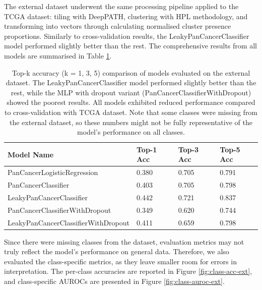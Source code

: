 \documentclass{l4proj}
\begin{document}
The external dataset underwent the same processing pipeline applied to the TCGA dataset: tiling with DeepPATH, clustering with HPL methodology, and transforming into vectors through calculating normalised cluster presence proportions. Similarly to cross-validation results, the LeakyPanCancerClassifier model performed slightly better than the rest. The comprehensive results from all models are summarised in Table \ref{tab:ext-results}.

\begin{table}[h]
\centering
\caption{Top-k accuracy (k = 1, 3, 5) comparison of models evaluated on the external dataset. The LeakyPanCancerClassifier model performed slightly better than the rest, while the MLP with dropout variant (PanCancerClassifierWithDropout) showed the poorest results. All models exhibited reduced performance compared to cross-validation with TCGA dataset. Note that some classes were missing from the external dataset, so these numbers might not be fully representative of the model's performance on all classes.}
\label{tab:ext-results}
\begin{tabular}{@{}llll@{}}
\textbf{Model Name}                 & \textbf{Top-1 Acc} & \textbf{Top-3 Acc} & \textbf{Top-5 Acc} \\ \midrule
PanCancerLogisticRegression         & 0.380              & 0.705              & 0.791              \\
PanCancerClassifier                 & 0.403              & 0.705              & 0.798              \\
LeakyPanCancerClassifier            & 0.442              & 0.721              & 0.837              \\
PanCancerClassifierWithDropout      & 0.349              & 0.620              & 0.744              \\
LeakyPanCancerClassifierWithDropout & 0.411              & 0.659              & 0.798             
\end{tabular}
\end{table}

Since there were missing classes from the dataset, evaluation metrics may not truly reflect the model's performance on general data. Therefore, we also evaluated the class-specific metrics, as they leave smaller room for errors in interpretation. The per-class accuracies are reported in Figure \ref{fig:class-acc-ext}, and class-specific AUROCs are presented in Figure \ref{fig:class-auroc-ext}.
\end{document}
